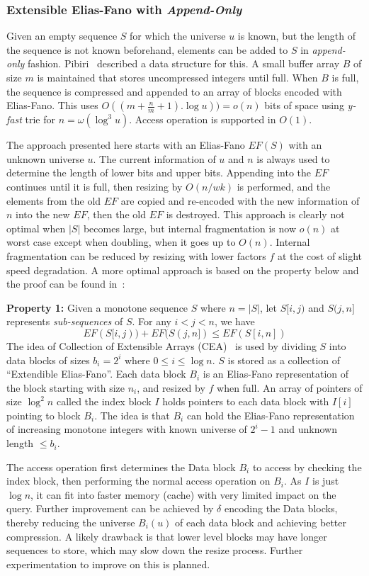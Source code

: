 \subsubsection{Extensible Elias-Fano with \textit{Append-Only}}
Given an empty sequence $S$ for which the universe $u$ is known, but the length of the sequence is not known beforehand, elements can be added to $S$ in \textit{append-only} fashion. Pibiri~\cite{Pibiri_2017} described a data structure for this. A small buffer array $B$ of size $m$ is maintained that stores uncompressed integers until full. When $B$ is full, the sequence is compressed and appended to an array of blocks encoded with Elias-Fano. This uses $O((m+\frac{n}{m} +1).\log u)) = o(n)$ bits of space using \textit{y-fast} trie for $n = \omega(\log^3 u)$. Access operation is supported in $O(1)$.\par
The approach presented here starts with an Elias-Fano $EF(S)$ with an unknown universe $u$. The current information of $u$ and $n$ is always used to determine the length of lower bits and upper bits. Appending into the $EF$ continues until it is full, then resizing by $O(n/wk)$ is performed, and the elements from the old $EF$ are copied and re-encoded with the new information of $n$ into the new $EF$, then the old $EF$ is destroyed. This approach is clearly not optimal when $|S|$ becomes large, but internal fragmentation is now $o(n)$ at worst case except when doubling, when it goes up to $O(n)$. Internal fragmentation can be reduced by resizing with lower factors $f$ at the cost of slight speed degradation. A more optimal approach is based on the property below and the proof can be found in~\cite{Pibiri_2017}:\par
\textbf{Property 1:} Given a monotone sequence $S$ where $n = |S|$, let $S[i, j)$ and $S(j, n]$ represents \textit{sub-sequences} of $S$. For any $i < j < n$, we have $$EF(S[i, j)) + EF(S(j, n]) \leq EF(S[i,n])$$
The idea of Collection of Extensible Arrays (CEA)~\cite{Stelios_2001, Raman_2003} is used by dividing $S$ into data blocks of sizes $b_i = 2^i$ where $0 \leq i \leq \log n$. $S$ is stored as a collection of ``Extendible Elias-Fano''. Each data block $B_i$ is an Elias-Fano representation of the block starting with size $n_i$, and resized by $f$ when full. An array of pointers of size $\log ^2n$ called the index block $I$ holds pointers to each data block with $I[i]$ pointing to block $B_i$. The idea is that $B_i$ can hold the Elias-Fano representation of increasing monotone integers with known universe of $2^i - 1$ and unknown length $\leq b_i$.\par
The access operation first determines the Data block $B_i$ to access by checking the index block, then performing the normal access operation on $B_i$. As $I$ is just $\log n$, it can fit into faster memory (cache) with very limited impact on the query. Further improvement can be achieved by $\delta$ encoding the Data blocks, thereby reducing the universe $B_i(u)$ of each data block and achieving better compression. A likely drawback is that lower level blocks may have longer sequences to store, which may slow down the resize process. Further experimentation to improve on this is planned. 
\FloatBarrier
